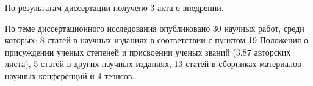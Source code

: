 По результатам диссертации получено 3 акта о внедрении.


\vspace{3mm}
\publications
\vspace{3mm}

По теме диссертационного исследования опубликовано 30 научных работ, среди которых: 8 статей в научных изданиях в соответствии с пунктом 19 Положения о присуждении ученых степеней и присвоении ученых званий (3,87 авторских листа), 5 статей в других научных изданиях, 13 статей в сборниках материалов научных конференций и 4 тезисов.
